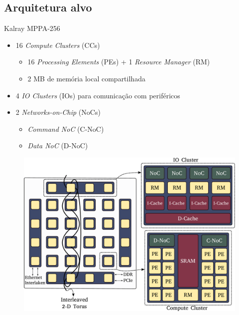 \documentclass{beamer}
\begin{document}
  \subsection{Arquitetura alvo}
    \begin{frame}{Kalray MPPA-256}
      \begin{itemize}
        \item 16 \textit{Compute Clusters} (CCs)
        \begin{itemize}
          \item 16 \textit{Processing Elements} (PEs) + 1 \textit{Resource Manager} (RM)
          \item 2 MB de memória local compartilhada
        \end{itemize}
        \item 4 \textit{IO Clusters} (IOs) para comunicação com periféricos
        \item 2 \textit{Networks-on-Chip} (NoCs)
        \begin{itemize}
          \item \textit{Command NoC} (C-NoC)
          \item \textit{Data NoC} (D-NoC)
        \end{itemize}
      \end{itemize}

      \begin{figure}
        \centering
        \includegraphics[width=0.50\linewidth]{images/arch-mppa.pdf}
        \label{fig:mppa}
      \end{figure}
    \end{frame}

\nocite{*}
\end{document}
